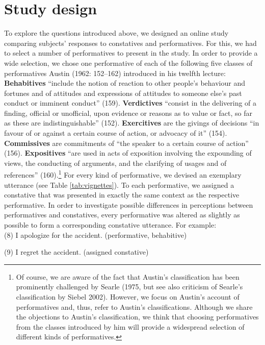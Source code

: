 \documentclass[egregdoesnotlikesansseriftitles,12pt]{scrartcl}
\begin{document}
\section{Study design}\label{sec:design}
To explore the questions introduced above, we designed an online study comparing subjects' responses to constatives and performatives. For this, we had to select a number of performatives to present in the study. In order to provide a wide selection, we chose one performative of each of the following five classes of performatives Austin (1962: 152--162) introduced in his twelfth lecture: \textbf{Behabitives} ``include the notion of reaction to other people's behaviour and fortunes and of attitudes and expressions of attitudes to someone else's past conduct or imminent conduct'' (159). \textbf{Verdictives} ``consist in the delivering of a finding, official or unofficial, upon evidence or reasons as to value or fact, so far as these are indistinguishable'' (152). \textbf{Exercitives} are the givings of decisions ``in favour of or against a certain course of action, or advocacy of it'' (154). \textbf{Commissives} are commitments of ``the speaker to a certain course of action'' (156). \textbf{Expositives} ``are used in acts of exposition involving the expounding of views, the conducting of arguments, and the clarifying of usages and of references'' (160).\footnote{Of course, we are aware of the fact that Austin's classification has been prominently challenged by Searle (1975, but see also criticism of Searle's classification by Siebel 2002). However, we focus on Austin's account of performatives and, thus, refer to Austin's classifications. Although we share the objections to Austin's classification, we think that choosing performatives from the classes introduced by him will provide a widespread selection of different kinds of performatives.} For every kind of performative, we devised an exemplary utterance (see Table \ref{tab:vignettes}). To each performative, we assigned a constative that was presented in exactly the same context as the respective performative. In order to investigate possible differences in perceptions between performatives and constatives, every performative was altered as slightly as possible to form a corresponding constative utterance. For example:\\

(8) I apologize for the accident. (performative, behabitive)\par
(9) I regret the accident. (assigned constative)\\
\end{document}

